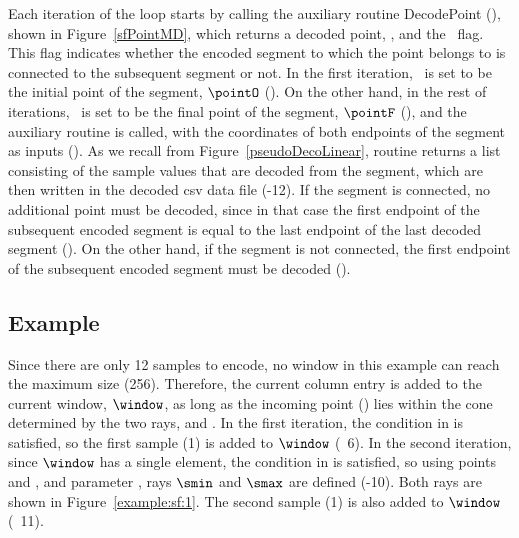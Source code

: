 Each iteration of the loop starts by calling the auxiliary routine DecodePoint (), shown in Figure~\ref{sfPointMD}, which returns a decoded point, \pointP, and the \connected\ flag. This flag indicates whether the encoded segment to which the point belongs to is connected to the subsequent segment or not.  In the first iteration, \pointP\ is set to be the initial point of the segment, $\pointO$ (). On the other hand, in the rest of iterations, \pointP\ is set to be the final point of the segment, $\pointF$ (), and the auxiliary routine \decodeSegment is called, with the coordinates of both endpoints of the segment as inputs (). As we recall from Figure~\ref{pseudoDecoLinear}, routine \decodeSegment returns a list consisting of the sample values that are decoded from the segment, which are then written in the decoded csv data file (-12). If the segment is connected, no additional point must be decoded, since in that case the first endpoint of the subsequent encoded segment is equal to the last endpoint of the last decoded segment (). On the other hand, if the segment is not connected, the first endpoint of the subsequent encoded segment must be decoded ().


\clearpage





\vspace{-5pt}


        


\clearpage
\subsection{Example}
\label{algo:sf:example}


\vspace{+5pt}
\exampleIntro{\ref{example:sf:1}}


Since there are only 12 samples to encode, no window in this example can reach the maximum size (256). Therefore, the current column entry is added to the current window, $\window$, as long as the incoming point (\incoming) lies within the cone determined by the two rays, \smin and \smax. In the first iteration, the condition in  is satisfied, so the first sample (1) is added to $\window$ (\Line~6). In the second iteration, since $\window$ has a single element, the condition in  is satisfied, so using points \snapshot and , and parameter \maxerror, rays $\smin$ and $\smax$ are defined (-10). Both rays are shown in Figure~\ref{example:sf:1}. The second sample (1) is also added to $\window$ (\Line~11). 


